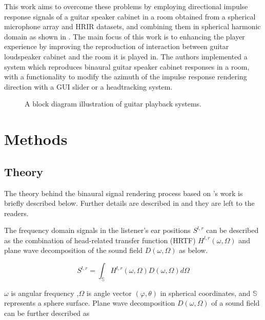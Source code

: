 \documentclass[convention,e-brief]{aesconf-current}
\begin{document}
This work aims to overcome these problems by employing directional impulse response signals of a guitar speaker cabinet in a room obtained from a spherical microphone array and HRIR datasets, and combining them in spherical harmonic domain as shown in \cite{Andersson2017-qg}.
The main focus of this work is to enhancing the player experience by improving the reproduction of interaction between guitar loudspeaker cabinet and the room it is played in.
The authors implemented a system which reproduces binaural guitar speaker cabinet responses in a room, with a functionality to modify the azimuth of the impulse response rendering direction with a GUI slider or a headtracking system.

\begin{figure}
    \begin{center}
        \caption{A block diagram illustration of guitar playback systems. } \label{fig:diag}
    \end{center}
\end{figure}



\section{Methods}

\subsection{Theory}
The theory behind the binaural signal rendering process based on \citeauthor{Andersson2017-qg}'s work \cite{Andersson2017-qg} is briefly described below.
Further details are described in \cite{Andersson2017-qg} and they are left to the readers.

The frequency domain signals in the listener's ear positions $S^{l, r}$ can be described as the combination of head-related transfer function (HRTF) $H^{l, r}(\omega, \Omega)$ and plane wave decomposition of the sound field $D(\omega, \Omega)$ as below.

\begin{equation}
    \label{hrtf_pw}
    S^{l, r}=\int_{\mathbb{S}} H^{l, r}(\omega, \Omega) D(\omega, \Omega) d \Omega
\end{equation}

$\omega$ is angular frequency ,$\Omega$ is angle vector $(\varphi, \theta)$ in spherical coordinates, and $\mathbb{S}$ represents a sphere surface.
Plane wave decomposition $D(\omega, \Omega)$ of a sound field can be further described as
\end{document}
